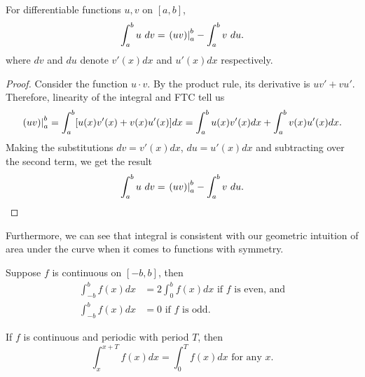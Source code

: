 \begin{thm}\label{IBP}
For differentiable functions $u,v$ on $[a,b]$,
\begin{equation}
  \int_{a}^{b}u\ dv=\eval{(uv)}^{b}_{a}-\int_{a}^{b}v\ du.
\end{equation}
where $dv$ and $du$ denote $v'(x)dx$ and $u'(x)dx$ respectively.
\end{thm}
\begin{proof}
  Consider the function $u\cdot v$. By the product rule, its derivative is $uv'+vu'$. Therefore, linearity of the integral and FTC tell us
  \begin{equation}
  \left. (uv) \right|^{b}_{a}= \int_{a}^{b}[u(x)v'(x)+v(x)u'(x)]dx=\int_{a}^{b}u(x)v'(x)dx + \int_{a}^{b}v(x)u'(x)dx.
\end{equation}
Making the substitutions $dv=v'(x)dx$, $du=u'(x)dx$ and subtracting over the second term, we get the result
\begin{equation*}
  \int_{a}^{b}u\ dv=\eval{(uv)}^{b}_{a}-\int_{a}^{b}v\ du.
\end{equation*}
\end{proof}

Furthermore, we can see that integral is consistent with our geometric intuition of area under the curve when it comes to functions with symmetry.
\begin{prop}\label{SymInt}
  Suppose $f$ is continuous on $[-b, b]$, then
  \begin{align}
    \int_{-b}^{b}f(x)dx&=2\int_{0}^{b}f(x)dx \text{ if  $f$ is even, and}\\
    \int_{-b}^{b}f(x)dx&=0  \text{ if  $f$ is odd}.
  \end{align}
\end{prop}

\begin{prop}\label{PerInt}
  If $f$ is continuous and periodic with period $T$, then \begin{equation}
      \int_{x}^{x+T}f(x)dx=\int_{0}^{T}f(x)dx \text{ for any $x$.}
  \end{equation}
\end{prop}

